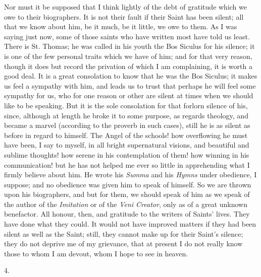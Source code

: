 Nor must it be supposed that I think lightly of the debt of
gratitude which we owe to their biographers. It is not their fault if
their Saint has been silent; all that we know about him, be it much,
be it little, we owe to them. As I was saying just now, some of those
saints who have written most have told us least. There is St. Thomas;
he was called in his youth the Bos Siculus for his silence; it is one
of the few personal traits which we have of him; and for that very
reason, though it does but record the privation of which I am
complaining, it is worth a good deal. It is a great consolation to
know that he was the Bos Siculus; it makes us feel a sympathy with
him, and leads us to trust that perhaps he will feel some sympathy for
us, who for one reason or other are silent at times when we should
like to be speaking. But it is the sole consolation for that forlorn
silence of his, since, although at length he broke it to some purpose,
as regards theology, and became a marvel (according to the proverb in
such cases), still he is as silent as before in regard to himself. The
Angel of the schools! how overflowing he must have been, I say to
myself, in all bright supernatural visions, and beautiful and sublime
thoughts! how serene in his contemplation of them! how winning in his
communication! but he has not helped me ever so little in apprehending
what I firmly believe about him. He wrote his \emph{Summa} and
his \emph{Hymns} under obedience, I suppose; and no obedience was
given him to speak of himself. So we are thrown upon his biographers,
and but for them, we should speak of him as we speak of the author of
the \emph{Imitation} or of the \emph{Veni Creator}, only as of a great
unknown benefactor. All honour, then, and gratitude to the writers of
Saints' lives. They have done what they could. It would not have
improved matters if they had been silent as well as the Saint; still,
they cannot make up for their Saint's silence; they do not deprive me
of my grievance, that at present I do not really know those to whom I
am devout, whom I hope to see in heaven.

4.

